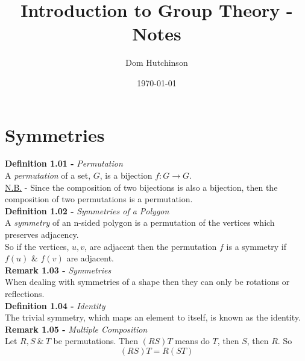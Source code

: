 \documentclass[11pt,a4paper]{article}
\begin{document}
\pagestyle{fancy}
\setlength\parindent{0pt}
\allowdisplaybreaks

\renewcommand{\headrulewidth}{0pt}
\newcommand{\vect}[1]{\boldsymbol{#1}}
\newcommand{\subtitle}[2]{\textbf{#1}\textit{#2} \\}
\newcommand{\dotprod}[0]{\boldsymbol{\cdot}}
\newcommand{\real}[0]{\mathbb{R}}
\newcommand{\nat}[0]{\mathbb{N}}
\newcommand{\field}[0]{\mathbb{F}}
\newcommand{\integers}[0]{\mathbb{Z}}
\newcommand{\vectorspace}[0]{\mathbb{V}}
\newcommand{\basis}[0]{\mathbb{B}}

\title{Introduction to Group Theory - Notes}
\author{Dom Hutchinson}
\date{\today}
\maketitle

\fancyhead[R]{\today}

\tableofcontents

\newpage

\section{Symmetries}

\subtitle{Definition 1.01 - }{Permutation}
A \textit{permutation} of a set, $G$, is a bijection $f : G \to G$.\\
\underline{N.B.} - Since the composition of two bijections is also a bijection, then the composition of two permutations is a permutation.\\

\subtitle{Definition 1.02 - }{Symmetries of a Polygon}
A \textit{symmetry} of an n-sided polygon is a permutation of the vertices which preserves adjacency.\\
So if the vertices, $u, v$, are adjacent then the permutation $f$ is a symmetry if $f(u)$ \& $f(v)$ are adjacent.\\

\subtitle{Remark 1.03 - }{Symmetries}
When dealing with symmetries of a shape then they can only be rotations or reflections.\\

\subtitle{Definition 1.04 - }{Identity}
The trivial symmetry, which maps an element to itself, is known as the identity.\\

\subtitle{Remark 1.05 - }{Multiple Composition}
Let $R, S\ \&\ T$ be permutations. Then $(RS)T$ means do $T$, then $S$, then $R$. So $$(RS)T = R(ST)$$
\end{document}
